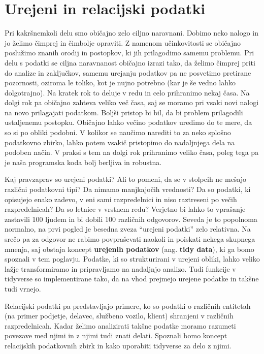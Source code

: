 \documentclass[
]{book}
\begin{document}
\hypertarget{urejeni-in-relacijski-podatki}{%
\chapter{Urejeni in relacijski podatki}\label{urejeni-in-relacijski-podatki}}

Pri kakršnemkoli delu smo običajno zelo ciljno naravnani. Dobimo neko nalogo in jo želimo čimprej in čimbolje opraviti. Z namenom učinkovitosti se običajno poslužimo znanih orodij in postopkov, ki jih prilagodimo samemu problemu. Pri delu s podatki se ciljna naravnanost običajno izrazi tako, da želimo čimprej priti do analize in zaključkov, samemu urejanju podatkov pa ne posvetimo pretirane pozornosti, oziroma le toliko, kot je nujno potrebno (kar je še vedno lahko dolgotrajno). Na kratek rok to deluje v redu in celo prihranimo nekaj časa. Na dolgi rok pa običajno zahteva veliko več časa, saj se moramo pri vsaki novi nalogi na novo prilagajati podatkom. Boljši pristop bi bil, da bi problem prilagodili ustaljenemu postopku. Običajno lahko večino podatkov uredimo do te mere, da so si po obliki podobni. V kolikor se naučimo narediti to za neko splošno podatkovno zbirko, lahko potem vsakič pristopimo do nadaljnjega dela na podoben način. V praksi s tem na dolgi rok prihranimo veliko časa, poleg tega pa je naša programska koda bolj berljiva in robustna.

Kaj pravzaprav so urejeni podatki? Ali to pomeni, da se v stolpcih ne mešajo različni podatkovni tipi? Da nimamo manjkajočih vrednosti? Da so podatki, ki opisujejo enako zadevo, v eni sami razpredelnici in niso raztreseni po večih razpredelnicah? Da so letnice v vrstnem redu? Verjetno bi lahko to vprašanje zastavili 100 ljudem in bi dobili 100 različnih odgovorov. Seveda je to popolnoma normalno, na prvi pogled je besedna zveza ``urejeni podatki'' zelo relativna. Na srečo pa za odgovor ne rabimo povpraševati naokoli in poiskati nekega skupnega mnenja, saj obstaja koncept \textbf{urejenih podatkov} (ang. \textbf{tidy data}), ki ga bomo spoznali v tem poglavju. Podatke, ki so strukturirani v urejeni obliki, lahko veliko lažje transformiramo in pripravljamo na nadaljnjo analizo. Tudi funkcije v tidyverse so implementirane tako, da na vhod prejmejo urejene podatke in takšne tudi vrnejo.

Relacijski podatki pa predstavljajo primere, ko so podatki o različnih entitetah (na primer podjetje, delavec, službeno vozilo, klient) shranjeni v različnih razpredelnicah. Kadar želimo analizirati takšne podatke moramo razumeti povezave med njimi in z njimi tudi znati delati. Spoznali bomo koncept relacijskih podatkovnih zbirk in kako uporabiti tidyverse za delo z njimi.
\end{document}
